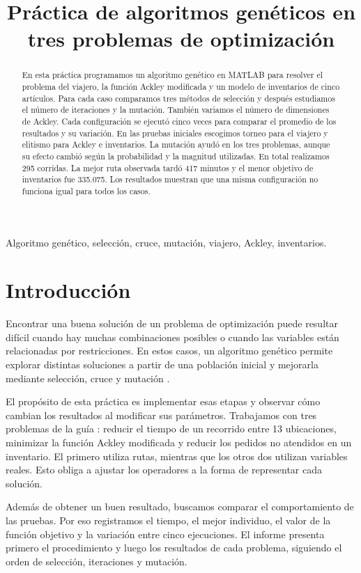 \documentclass[conference]{IEEEtran}
\title{Práctica de algoritmos genéticos en tres problemas de optimización}
\author{\IEEEauthorblockN{Jerónimo Vallejo Castro}\IEEEauthorblockA{Facultad de Ingenierías\\Universidad Católica de Oriente\\Bioingeniería, Unidad 3}}
\begin{document}
\maketitle
\raggedbottom
\begin{abstract}
En esta práctica programamos un algoritmo genético en MATLAB para resolver el problema del viajero, la función Ackley modificada y un modelo de inventarios de cinco artículos. Para cada caso comparamos tres métodos de selección y después estudiamos el número de iteraciones y la mutación. También variamos el número de dimensiones de Ackley. Cada configuración se ejecutó cinco veces para comparar el promedio de los resultados y su variación. En las pruebas iniciales escogimos torneo para el viajero y elitismo para Ackley e inventarios. La mutación ayudó en los tres problemas, aunque su efecto cambió según la probabilidad y la magnitud utilizadas. En total realizamos 295 corridas. La mejor ruta observada tardó 417 minutos y el menor objetivo de inventarios fue 335.075. Los resultados muestran que una misma configuración no funciona igual para todos los casos.
\end{abstract}
\begin{IEEEkeywords}
Algoritmo genético, selección, cruce, mutación, viajero, Ackley, inventarios.
\end{IEEEkeywords}

\section{Introducción}
Encontrar una buena solución de un problema de optimización puede resultar difícil cuando hay muchas combinaciones posibles o cuando las variables están relacionadas por restricciones. En estos casos, un algoritmo genético permite explorar distintas soluciones a partir de una población inicial y mejorarla mediante selección, cruce y mutación \cite{ref1}.

El propósito de esta práctica es implementar esas etapas y observar cómo cambian los resultados al modificar sus parámetros. Trabajamos con tres problemas de la guía \cite{ref8}: reducir el tiempo de un recorrido entre 13 ubicaciones, minimizar la función Ackley modificada y reducir los pedidos no atendidos en un inventario. El primero utiliza rutas, mientras que los otros dos utilizan variables reales. Esto obliga a ajustar los operadores a la forma de representar cada solución.

Además de obtener un buen resultado, buscamos comparar el comportamiento de las pruebas. Por eso registramos el tiempo, el mejor individuo, el valor de la función objetivo y la variación entre cinco ejecuciones. El informe presenta primero el procedimiento y luego los resultados de cada problema, siguiendo el orden de selección, iteraciones y mutación.
\end{document}
